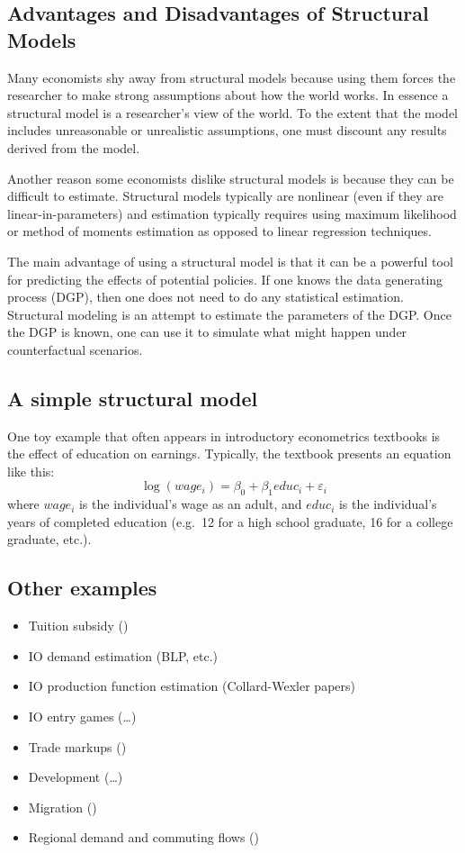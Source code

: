 \documentclass[]{book}
\begin{document}
\subsection{Advantages and Disadvantages of Structural
Models}\label{advantages-and-disadvantages-of-structural-models}

Many economists shy away from structural models because using them
forces the researcher to make strong assumptions about how the world
works. In essence a structural model is a researcher's view of the
world. To the extent that the model includes unreasonable or unrealistic
assumptions, one must discount any results derived from the model.

Another reason some economists dislike structural models is because they
can be difficult to estimate. Structural models typically are nonlinear
(even if they are linear-in-parameters) and estimation typically
requires using maximum likelihood or method of moments estimation as
opposed to linear regression techniques.

The main advantage of using a structural model is that it can be a
powerful tool for predicting the effects of potential policies. If one
knows the data generating process (DGP), then one does not need to do
any statistical estimation. Structural modeling is an attempt to
estimate the parameters of the DGP. Once the DGP is known, one can use
it to simulate what might happen under counterfactual scenarios.

\subsection{A simple structural model}\label{a-simple-structural-model}

One toy example that often appears in introductory econometrics
textbooks is the effect of education on earnings. Typically, the
textbook presents an equation like this:
\[\log\left(wage_{i}\right)=\beta_0 + \beta_{1}educ_{i}+\varepsilon_{i}\]
where $wage_i$ is the individual's wage as an adult, and $educ_i$ is the
individual's years of completed education (e.g.~12 for a high school
graduate, 16 for a college graduate, etc.).

\subsection{Other examples}\label{other-examples}

\begin{itemize}
\itemsep1pt\parskip0pt
\item
  Tuition subsidy (\citet{keaneWolpin1997})
\item
  IO demand estimation (BLP, etc.)
\item
  IO production function estimation (Collard-Wexler papers)
\item
  IO entry games (\ldots{})
\item
  Trade markups (\citet{deLoecker_al2018})
\item
  Development (\ldots{})
\item
  Migration (\citet{kennanWalker2011})
\item
  Regional demand and commuting flows (\citet{monte_al2018})
\end{itemize}
\end{document}
